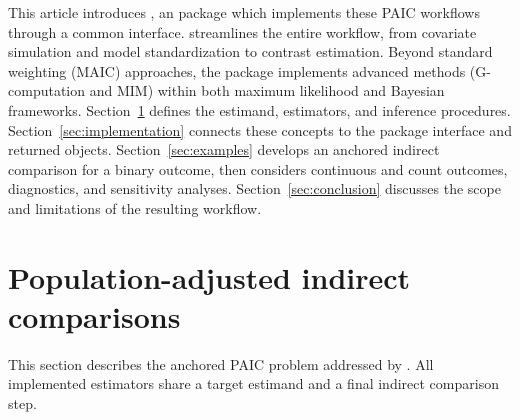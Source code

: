\documentclass[article]{jss}
\begin{document}

This article introduces  \citep{RemiroAzocar2022c}, an  package which implements these PAIC workflows through a common interface.  streamlines the entire workflow, from covariate simulation and model standardization to contrast estimation. Beyond standard weighting (MAIC) approaches, the package implements advanced methods (G-computation and MIM) within both maximum likelihood and Bayesian frameworks. Section~\ref{sec:methodology} defines the estimand, estimators, and inference procedures. Section~\ref{sec:implementation} connects these concepts to the package interface and returned objects. Section~\ref{sec:examples} develops an anchored indirect comparison for a binary outcome, then considers continuous and count outcomes, diagnostics, and sensitivity analyses. Section~\ref{sec:conclusion} discusses the scope and limitations of the resulting workflow.





\section{Population-adjusted indirect comparisons}
\label{sec:methodology}

This section describes the anchored PAIC problem addressed by . All implemented estimators share a target estimand and a final indirect comparison step. 

\end{document}
